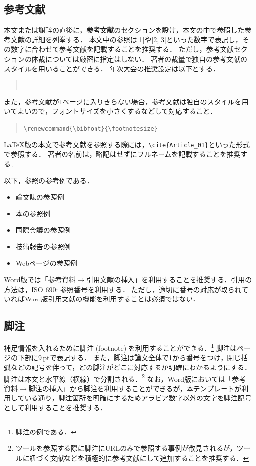 \documentclass[
  platex, dvipdfmx,  %
]{nlp2026}
\begin{document}
\subsection{参考文献}
本文または謝辞の直後に，\textbf{参考文献}のセクションを設け，本文の中で参照した参考文献の詳細を列挙する．
本文中の参照は[1]や[2, 3]といった数字で表記し，その数字に合わせて参考文献を記載することを推奨する．
ただし，参考文献セクションの体裁については厳密に指定はしない．
著者の裁量で独自の参考文献のスタイルを用いることができる．
年次大会の推奨設定は以下とする．
\begin{quote}
\verb||\\
\verb||
\end{quote}
%
また，参考文献が1ページに入りきらない場合，参考文献は独自のスタイルを用いてよいので，フォントサイズを小さくするなどして対応すること．
\begin{quote}
\verb|\renewcommand{\bibfont}{\footnotesize}|
\end{quote}



LaTeX版の本文で参考文献を参照する際には，\verb|\cite{Article_01}|といった形式で参照する．
%
著者の名前は，略記はせずにフルネームを記載することを推奨する．

以下，参照の参考例である．
\begin{itemize}
\item 論文誌の参照例 \cite{Article_01}
\item 本の参照例 \cite{Book_02}
\item 国際会議の参照例 \cite{Inproc_03}
\item 技術報告の参照例 \cite{Techrep_05}
\item Webページの参照例 \cite{Web_06}
\end{itemize}

Word版では「参考資料$\xrightarrow{}$引用文献の挿入」を利用することを推奨する．引用の方法は，ISO 690: 参照番号を利用する．
ただし，適切に番号の対応が取られていればWord版引用文献の機能を利用することは必須ではない．


\subsection{脚注}
補足情報を入れるために脚注 (footnote) を利用することができる．\footnote{脚注の例である．}
脚注はページの下部に9\,ptで表記する．
また，脚注は論文全体で1から番号をつけ，閉じ括弧などの記号を伴って，どの脚注がどこに対応するか明確にわかるようにする．
脚注は本文と水平線（横線）で分割される．\footnote{ツールを参照する際に脚注にURLのみで参照する事例が散見されるが，ツールに紐づく文献などを積極的に参考文献にして追加することを推奨する．}
なお，Word版においては「参考資料$\xrightarrow{}$脚注の挿入」から脚注を利用することができるが，本テンプレートが利用している通り，脚注箇所を明確にするためアラビア数字以外の文字を脚注記号として利用することを推奨する．
\end{document}
